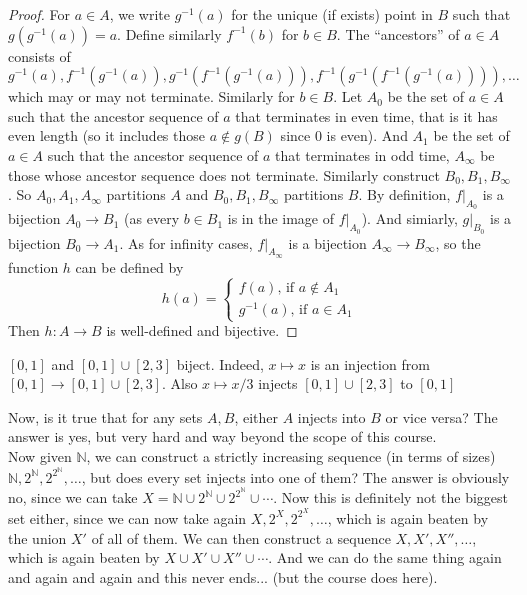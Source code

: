 \begin{proof}
    For $a\in A$, we write $g^{-1}(a)$ for the unique (if exists) point in $B$ such that $g(g^{-1}(a))=a$.
    Define similarly $f^{-1}(b)$ for $b\in B$.
    The ``ancestors'' of $a\in A$ consists of
    $$g^{-1}(a), f^{-1}(g^{-1}(a)),g^{-1}(f^{-1}(g^{-1}(a))),f^{-1}(g^{-1}(f^{-1}(g^{-1}(a)))),\ldots$$
    which may or may not terminate.
    Similarly for $b\in B$.
    Let $A_0$ be the set of $a\in A$ such that the ancestor sequence of $a$ that terminates in even time, that is it has even length (so it includes those $a\notin g(B)$ since $0$ is even).
    And $A_1$ be the set of $a\in A$ such that the ancestor sequence of $a$ that terminates in odd time, $A_\infty$ be those whose ancestor sequence does not terminate.
    Similarly construct $B_0,B_1,B_\infty$.
    So $A_0,A_1,A_\infty$ partitions $A$ and $B_0,B_1,B_\infty$ partitions $B$.
    By definition, $f|_{A_0}$ is a bijection $A_0\to B_1$ (as every $b\in B_1$ is in the image of $f|_{A_0}$).
    And simiarly, $g|_{B_0}$ is a bijection $B_0\to A_1$.
    As for infinity cases, $f|_{A_\infty}$ is a bijection $A_{\infty}\to B_\infty$, so the function $h$ can be defined by
    $$h(a)=
    \begin{cases}
        f(a)\text{, if $a\notin A_1$}\\
        g^{-1}(a)\text{, if $a\in A_1$}
    \end{cases}$$
    Then $h:A\to B$ is well-defined and bijective.
\end{proof}
\begin{example}
    $[0,1]$ and $[0,1]\cup [2,3]$ biject.
    Indeed, $x\mapsto x$ is an injection from $[0,1]\to [0,1]\cup [2,3]$.
    Also $x\mapsto x/3$ injects $[0,1]\cup[2,3]$ to $[0,1]$
\end{example}
Now, is it true that for any sets $A,B$, either $A$ injects into $B$ or vice versa?
The answer is yes, but very hard and way beyond the scope of this course.\\
Now given $\mathbb N$, we can construct a strictly increasing sequence (in terms of sizes) $\mathbb N,2^{\mathbb N}, 2^{2^{\mathbb N}},\ldots$, but does every set injects into one of them?
The answer is obviously no, since we can take $X=\mathbb N\cup 2^{\mathbb N}\cup 2^{2^{\mathbb N}}\cup\cdots$.
Now this is definitely not the biggest set either, since we can now take again $X,2^X, 2^{2^X},\ldots$, which is again beaten by the union $X'$ of all of them.
We can then construct a sequence $X,X',X'',\ldots$, which is again beaten by $X\cup X'\cup X''\cup\cdots$.
And we can do the same thing again and again and again and this never ends... (but the course does here).